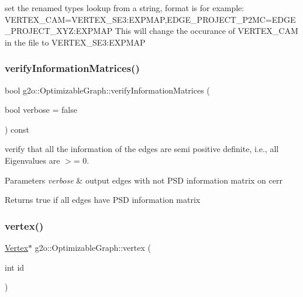 set the renamed types lookup from a string, format is for example\+: V\+E\+R\+T\+E\+X\+\_\+\+C\+AM=V\+E\+R\+T\+E\+X\+\_\+\+S\+E3\+:E\+X\+P\+M\+AP,E\+D\+G\+E\+\_\+\+P\+R\+O\+J\+E\+C\+T\+\_\+\+P2\+MC=E\+D\+G\+E\+\_\+\+P\+R\+O\+J\+E\+C\+T\+\_\+\+X\+YZ\+:E\+X\+P\+M\+AP This will change the occurance of V\+E\+R\+T\+E\+X\+\_\+\+C\+AM in the file to V\+E\+R\+T\+E\+X\+\_\+\+S\+E3\+:E\+X\+P\+M\+AP \mbox{\label{structg2o_1_1_optimizable_graph_a23dbb64bd31deb3952d4149518e663ce}} 
\subsubsection{\texorpdfstring{verify\+Information\+Matrices()}{verifyInformationMatrices()}}
{\footnotesize\ttfamily bool g2o\+::\+Optimizable\+Graph\+::verify\+Information\+Matrices (\begin{DoxyParamCaption}\item[{bool}]{verbose = {\ttfamily false} }\end{DoxyParamCaption}) const}

verify that all the information of the edges are semi positive definite, i.\+e., all Eigenvalues are $>$= 0. 
\begin{DoxyParams}{Parameters}
{\em verbose} & output edges with not P\+SD information matrix on cerr \\
\hline
\end{DoxyParams}
\begin{DoxyReturn}{Returns}
true if all edges have P\+SD information matrix 
\end{DoxyReturn}
\mbox{\label{structg2o_1_1_optimizable_graph_a19e014e8ec2e9a6e894da8c3a8f8e50d}} 
\subsubsection{\texorpdfstring{vertex()}{vertex()}\hspace{0.1cm}{\footnotesize\ttfamily [1/2]}}
{\footnotesize\ttfamily \mbox{\hyperlink{classg2o_1_1_optimizable_graph_1_1_vertex}{Vertex}}$\ast$ g2o\+::\+Optimizable\+Graph\+::vertex (\begin{DoxyParamCaption}\item[{int}]{id }\end{DoxyParamCaption})\hspace{0.3cm}{\ttfamily [inline]}}



